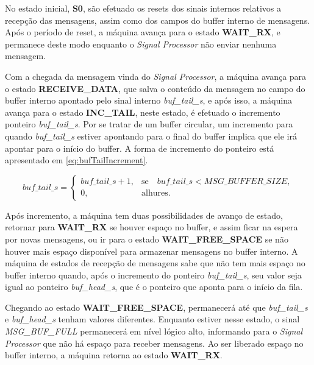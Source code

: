 \documentclass[monografia]{subfiles}
\begin{document}
			No estado inicial, \textbf{S0}, são efetuado os resets dos sinais internos relativos a recepção das mensagens, assim como dos campos do buffer interno
			de mensagens. Após o período de reset, a máquina avança para o estado \textbf{WAIT\_RX}, e permanece deste modo enquanto o \textit{Signal Processor}
			não enviar nenhuma mensagem.

			Com a chegada da mensagem vinda do \textit{Signal Processor}, a máquina avança para o estado \textbf{RECEIVE\_DATA}, que salva o conteúdo da 
			mensagem no campo do buffer interno apontado pelo sinal interno \textit{buf\_tail\_s}, e após isso, a máquina avança para o 
			estado \textbf{INC\_TAIL}, neste estado, é efetuado o incremento ponteiro \textit{buf\_tail\_s}. Por se tratar de um buffer circular, um incremento 
			para quando \textit{buf\_tail\_s} estiver apontando para o final do buffer implica que ele irá apontar para o início  do buffer. A forma de
			incremento do ponteiro está apresentado em \ref{eq:bufTailIncrement}.

				\begin{equation}
					{buf\_tail\_s} = \left\{\begin{array}{rl}
					{buf\_tail\_s}+1,&\mbox{se}\quad {buf\_tail\_s} < {MSG\_BUFFER\_SIZE},\\
					0, &\mbox{alhures.}\quad
				\end{array}\right.
				\label{eq:bufTailIncrement}
				\end{equation}

				\newpage

				Após incremento, a máquina tem duas possibilidades de avanço de estado, retornar para \textbf{WAIT\_RX} se houver espaço no buffer, 
				e assim ficar na espera por novas mensagens, ou 
				ir para o estado \textbf{WAIT\_FREE\_SPACE} se não houver mais espaço disponível para armazenar mensagens no buffer interno.
				A máquina de estados de recepção de mensagens sabe que não tem mais espaço no buffer interno quando, após o incremento do ponteiro 
				\textit{buf\_tail\_s}, seu valor seja igual ao ponteiro \textit{buf\_head\_s}, que é o ponteiro que aponta para o início da fila.

				Chegando ao estado \textbf{WAIT\_FREE\_SPACE}, permanecerá até que \textit{buf\_tail\_s} e \textit{buf\_head\_s} tenham valores diferentes.
				Enquanto  estiver nesse estado, o sinal \textit{MSG\_BUF\_FULL} permanecerá em nível lógico alto, informando para o \textit{Signal Processor}
				que não há espaço para receber mensagens. Ao ser liberado espaço no buffer interno, a máquina retorna ao estado \textbf{WAIT\_RX}.
				
\end{document}
